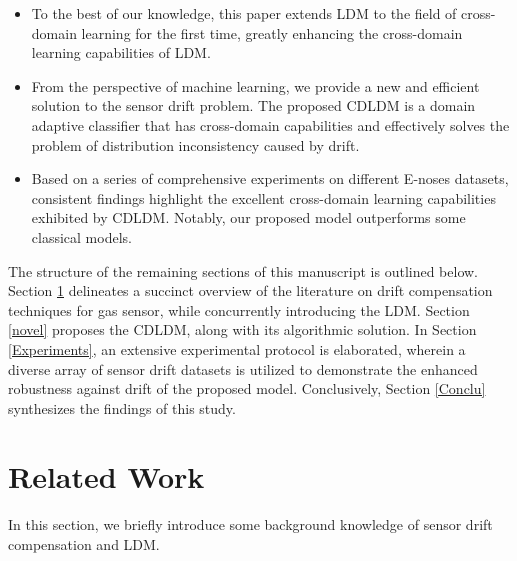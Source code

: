 \documentclass[a4paper]{cas-sc}
\begin{document}
\begin{itemize}
   \item [$\bullet$]To the best of our knowledge, this paper extends LDM to the field of cross-domain learning for the first time, greatly enhancing the cross-domain learning capabilities of LDM.
   
    \item [$\bullet$] From the perspective of machine learning, we provide a new and efficient solution to the sensor drift problem. The proposed CDLDM is a domain adaptive classifier that has cross-domain capabilities and effectively solves the problem of distribution inconsistency caused by drift.
    
    \item [$\bullet$] Based on a series of comprehensive experiments on different E-noses datasets, consistent findings highlight the excellent cross-domain learning capabilities exhibited by CDLDM. Notably, our proposed model outperforms some classical models.
\end{itemize} 

The structure of the remaining sections of this manuscript is outlined below.
Section \ref{rel} delineates a succinct overview of the literature on drift compensation techniques for gas sensor, while concurrently introducing the LDM. Section \ref{novel} proposes the CDLDM, along with its algorithmic solution. In Section \ref{Experiments}, an extensive experimental protocol is elaborated, wherein a diverse array of sensor drift datasets is utilized to demonstrate the enhanced robustness against drift of the proposed model. Conclusively, Section \ref{Conclu} synthesizes the findings of this study.




\section{ Related Work}\label{rel}
In this section, we briefly introduce some background knowledge of sensor drift compensation and LDM.
\end{document}
